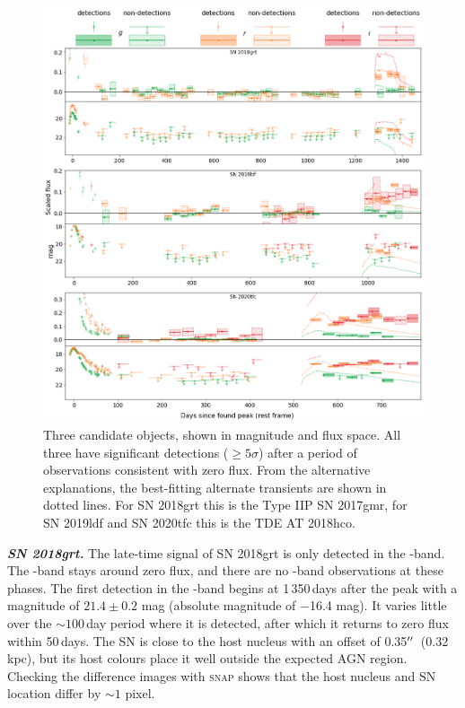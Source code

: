 \documentclass[a4paper,oneside,12pt, class=Latex/Classes/PhDthesisPSnPDF, crop=false]{standalone}
\begin{document}
\begin{figure}
 \centering
 \includegraphics[width=\textwidth]{../Images/chapter_3/candid_plots.png}
 \caption{Three candidate objects, shown in magnitude and flux space. All three have significant detections ($\geq5\sigma$) after a period of observations consistent with zero flux. From the alternative explanations, the best-fitting alternate transients are shown in dotted lines. For SN 2018grt this is the Type IIP SN 2017gmr, for SN 2019ldf and SN 2020tfc this is the TDE AT 2018hco.}
 \label{candidates}
\end{figure}

\textit{\textbf{SN 2018grt.}}
The late-time signal of SN 2018grt is only detected in the \ztfr-band. The \ztfg-band stays around zero flux, and there are no \ztfi-band observations at these phases. The first detection in the \ztfr-band begins at 1\,350\,days after the peak with a magnitude of $21.4\pm0.2$ mag (absolute magnitude of $-$16.4 mag). It varies little over the $\sim100$\,day period where it is detected, after which it returns to zero flux within 50\,days. The SN is close to the host nucleus with an offset of 0.35$^{\prime\prime}$~(0.32 kpc), but its host colours place it well outside the expected AGN region. Checking the difference images with \textsc{snap} shows that the host nucleus and SN location differ by $\sim1$ pixel.
\end{document}
